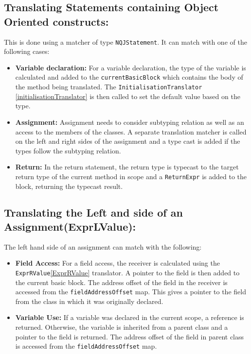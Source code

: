 \documentclass[]{tukportfolio}
\begin{document}
	\subsection{Translating Statements containing Object Oriented constructs:}
	This is done using a matcher of type \lstinline|NQJStatement|. It can match with one of the following cases:
	\begin{itemize}
		\item \textbf{Variable declaration:} For a variable declaration, the type of the variable is calculated and added to the \lstinline|currentBasicBlock| which contains the body of the method being translated. The \lstinline|InitialisationTranslator| \ref{initialisationTranslator} is then called to set the default value based on the type.
		\item \textbf{Assignment:} Assignment needs to consider subtyping relation  as well as an access to the members of the classes. A separate translation matcher is called on the left and right sides of the assignment and a type cast is added if the types follow the subtyping relation.
		\item \textbf{Return:} In the return statement, the return type is typecast to the target return type of the current method in scope and a \lstinline|ReturnExpr| is added to the block, returning the typecast result.
	\end{itemize}
	
	\subsection{Translating the Left and side of an Assignment(ExprLValue):} \label{ExprLValue} The left hand side of an assignment can match with the following:
	\begin{itemize}
		\item \textbf{Field Access:} For a field access, the receiver is calculated using the \lstinline|ExprRValue|\ref{ExprRValue} translator. A pointer to the field is then added to the current basic block. The address offset of the field in the receiver is accessed from the \lstinline|fieldAddressOffset| map. This gives a pointer to the field from the class in which it was originally declared.
		\item  \textbf{Variable Use:} If a variable was declared in the current scope, a reference is returned. Otherwise, the variable is inherited from a parent class and a pointer to the field is returned.  The address offset of the field in parent class is accessed from the \lstinline|fieldAddressOffset| map.
	\end{itemize}
\end{document}
